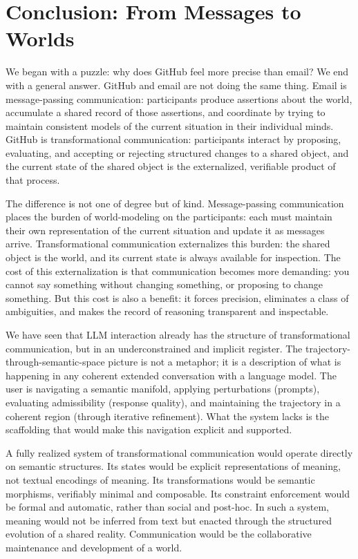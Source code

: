 \documentclass[12pt, letterpaper]{article}
\begin{document}
\section{Conclusion: From Messages to Worlds}

We began with a puzzle: why does GitHub feel more precise than email? We end with a general answer. GitHub and email are not doing the same thing. Email is message-passing communication: participants produce assertions about the world, accumulate a shared record of those assertions, and coordinate by trying to maintain consistent models of the current situation in their individual minds. GitHub is transformational communication: participants interact by proposing, evaluating, and accepting or rejecting structured changes to a shared object, and the current state of the shared object is the externalized, verifiable product of that process.

The difference is not one of degree but of kind. Message-passing communication places the burden of world-modeling on the participants: each must maintain their own representation of the current situation and update it as messages arrive. Transformational communication externalizes this burden: the shared object is the world, and its current state is always available for inspection. The cost of this externalization is that communication becomes more demanding: you cannot say something without changing something, or proposing to change something. But this cost is also a benefit: it forces precision, eliminates a class of ambiguities, and makes the record of reasoning transparent and inspectable.

We have seen that LLM interaction already has the structure of transformational communication, but in an underconstrained and implicit register. The trajectory-through-semantic-space picture is not a metaphor; it is a description of what is happening in any coherent extended conversation with a language model. The user is navigating a semantic manifold, applying perturbations (prompts), evaluating admissibility (response quality), and maintaining the trajectory in a coherent region (through iterative refinement). What the system lacks is the scaffolding that would make this navigation explicit and supported.

A fully realized system of transformational communication would operate directly on semantic structures. Its states would be explicit representations of meaning, not textual encodings of meaning. Its transformations would be semantic morphisms, verifiably minimal and composable. Its constraint enforcement would be formal and automatic, rather than social and post-hoc. In such a system, meaning would not be inferred from text but enacted through the structured evolution of a shared reality. Communication would be the collaborative maintenance and development of a world.
\end{document}
